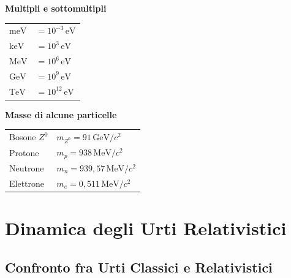 \begin{center}
\renewcommand{\arraystretch}{1.2}
\begin{minipage}[t]{0.42\textwidth}
\centering
\textbf{Multipli e sottomultipli}\\[4pt]
\begin{tabular}{@{}ll@{}}
\toprule
$\mathrm{meV}$ & $= 10^{-3} \, \mathrm{eV}$ \\
$\mathrm{keV}$ & $= 10^{3} \, \mathrm{eV}$ \\
$\mathrm{MeV}$ & $= 10^{6} \, \mathrm{eV}$ \\
$\mathrm{GeV}$ & $= 10^{9} \, \mathrm{eV}$ \\
$\mathrm{TeV}$ & $= 10^{12} \, \mathrm{eV}$ \\
\bottomrule
\end{tabular}
\end{minipage}
\hfill
\begin{minipage}[t]{0.52\textwidth}
\centering
\textbf{Masse di alcune particelle}\\[4pt]
\begin{tabular}{@{}ll@{}}
\toprule
Bosone $Z^0$ & $m_{Z^0} = 91 \, \mathrm{GeV}/c^2$ \\
Protone & $m_p = 938 \, \mathrm{MeV}/c^2$ \\
Neutrone & $m_n = 939{,}57 \, \mathrm{MeV}/c^2$ \\
Elettrone & $m_e = 0{,}511 \, \mathrm{MeV}/c^2$ \\
\bottomrule
\end{tabular}
\end{minipage}
\end{center}

\section{Dinamica degli Urti Relativistici}

\subsection{Confronto fra Urti Classici e Relativistici}

